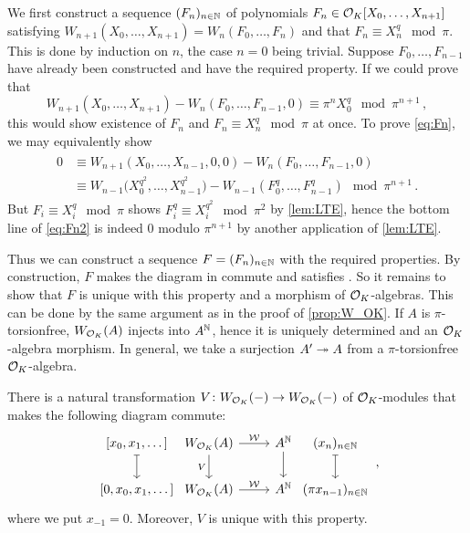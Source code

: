 \documentclass[a4paper, 10pt, oneside, DIV=9, chapterprefix=true, numbers=enddot,bibliography=totoc]{scrbook}
\begin{document}
\begin{proof*}
	We first construct a sequence $(F_n)_{n\in\mathbb{N}}$ of polynomials $F_n\in \mathcal{O}_K[X_0,\dotsc,X_{n+1}]$ satisfying $W_{n+1}(X_0,\dotsc,X_{n+1})=W_n(F_0,\dotsc,F_n)$ and that $F_n\equiv X_n^q\mod \pi$. This is done by induction on $n$, the case $n=0$ being trivial. Suppose $F_0,\dotsc,F_{n-1}$ have already been constructed and have the required property. If we could prove that
	\begin{equation}\label{eq:Fn}
		W_{n+1}(X_0,\dotsc,X_{n+1})-W_n(F_0,\dotsc,F_{n-1},0)\equiv \pi^n X_0^q\mod \pi^{n+1}\,,
	\end{equation}
	this would show existence of $F_n$ and $F_n\equiv X_n^q\mod \pi$ at once. To prove \cref{eq:Fn}, we may equivalently show
	\begin{align}\label{eq:Fn2}
		\begin{split}
			0&\equiv W_{n+1}(X_0,\dotsc,X_{n-1},0,0)-W_n(F_0,\dotsc,F_{n-1},0)\\
			&\equiv W_{n-1}\big(X_0^{q^2},\dotsc,X_{n-1}^{q^2}\big)-W_{n-1}\left(F_0^q,\dotsc,F_{n-1}^q\right)\mod \pi^{n+1}\,.
		\end{split}
	\end{align}
	But $F_i\equiv X_i^q\mod \pi$ shows $F_i^q\equiv X_i^{q^2}\mod \pi^2$ by \cref{lem:LTE}, hence the bottom line of \cref{eq:Fn2} is indeed $0$ modulo $\pi^{n+1}$ by another application of \cref{lem:LTE}.
	
	Thus we can construct a sequence $F=(F_n)_{n\in \mathbb{N}}$ with the required properties. By construction, $F$ makes the diagram in  commute and satisfies . So it remains to show that $F$ is unique with this property and a morphism of $\mathcal{O}_K$-algebras. This can be done by the same argument as in the proof of \cref{prop:W_OK}. If $A$ is $\pi$-torsionfree, $W_{\mathcal{O}_K}(A)$ injects into $A^{\mathbb{N}}$, hence it is uniquely determined and an $\mathcal{O}_K$-algebra morphism. In general, we take a surjection $A'\epimorphism A$ from a $\pi$-torsionfree $\mathcal{O}_K$-algebra.
\end{proof*}
\begin{lem}
	There is a natural transformation $V\colon W_{\Oo_K}(-)\morphism W_{\Oo_K}(-)$ of $\mathcal{O}_K$-modules that makes the following diagram commute:
	\begin{equation*}
		\begin{tikzcd}
			{[x_0,x_1,\dotsc]}\dar[|->] &[-2.4em] W_{\Oo_K}(A)\dar["V"{swap}]\rar["\Ww"] & A^\IN\dar &[-2.4em] (x_n)_{n\in\IN}\dar[|->]\\
			{[0,x_0,x_1,\dotsc]} &[-2.4em] W_{\Oo_K}(A) \rar["\Ww"] & A^\IN &[-2.4em] (\pi x_{n-1})_{n\in\IN}
		\end{tikzcd}\,,
	\end{equation*}
	where we put $x_{-1}=0$. Moreover, $V$ is unique with this property.
\end{lem}
\end{document}

